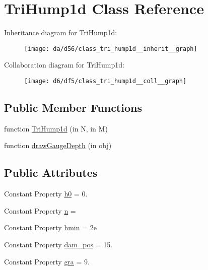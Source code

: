 \hypertarget{class_tri_hump1d}{}\section{Tri\+Hump1d Class Reference}
\label{class_tri_hump1d}


Inheritance diagram for Tri\+Hump1d\+:
\nopagebreak
\begin{figure}[H]
\begin{center}
\leavevmode
\texttt{[image: da/d56/class\_tri\_hump1d\_\_inherit\_\_graph]}
\end{center}
\end{figure}


Collaboration diagram for Tri\+Hump1d\+:
\nopagebreak
\begin{figure}[H]
\begin{center}
\leavevmode
\texttt{[image: d6/df5/class\_tri\_hump1d\_\_coll\_\_graph]}
\end{center}
\end{figure}
\subsection*{Public Member Functions}
\begin{DoxyCompactItemize}
\item 
function \hyperlink{class_tri_hump1d_a3cafd7b39c1664414c97da74ef627b7c}{Tri\+Hump1d} (in N, in M)
\item 
function \hyperlink{class_tri_hump1d_a40e99f402edee54eacabecd4e9d61aad}{draw\+Gauge\+Depth} (in obj)
\end{DoxyCompactItemize}
\subsection*{Public Attributes}
\begin{DoxyCompactItemize}
\item 
Constant Property \hyperlink{class_tri_hump1d_a001155d8fb406c12bc2fa30d3a940a88}{h0} = 0.
\item 
Constant Property \hyperlink{class_tri_hump1d_a8c2abb8b74705baf17f0969dfb2c200b}{n} =
\item 
Constant Property \hyperlink{class_tri_hump1d_a84db38e27b4daba3eb1115d2f59b5591}{hmin} = 2e
\item 
Constant Property \hyperlink{class_tri_hump1d_a22990dde53263afe1dd4d69a75932075}{dam\+\_\+pos} = 15.
\item 
Constant Property \hyperlink{class_tri_hump1d_a9dc1850d97e4254d36784c1cc2dc268d}{gra} = 9.
\end{DoxyCompactItemize}
